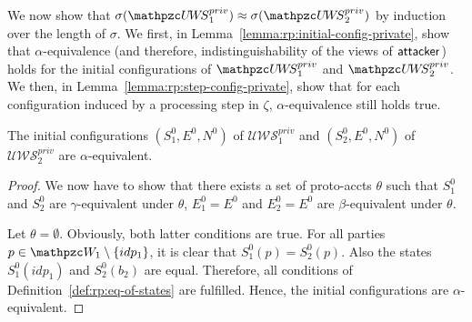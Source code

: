   We now show that $\sigma(\uppressoprivwebsystem_1) \approx
  \sigma(\uppressoprivwebsystem_2)$ by induction over the length 
  of $\sigma$. 
  We first, in Lemma~\ref{lemma:rp:initial-config-private}, 
  show that $\alpha$-equivalence (and therefore, 
  indistinguishability of the views of $\mathsf{attacker}$) holds 
  for the initial configurations of $\uppressoprivwebsystem_1$ 
  and $\uppressoprivwebsystem_2$. 
  We then, in Lemma~\ref{lemma:rp:step-config-private}, 
  show that for each configuration induced by a processing step 
  in $\zeta$, $\alpha$-equivalence still holds true.
  
  \begin{lemma}\label{lemma:rp:initial-config-private}
    The initial configurations $(S_1^0,E^0,N^0)$ of 
    $\mathcal{U\!W\!S}^{priv}_1$ and $(S_2^0,E^0,N^0)$ of 
    $\mathcal{U\!W\!S}^{priv}_2$ are $\alpha$-equivalent.
  \end{lemma}
  \begin{proof}
    We now have to show that there exists a set of proto-accts 
    $\theta$ such that $S_1^0$ and $S_2^0$ are 
    $\gamma$-equivalent under $\theta$, $E_1^0 = E^0$ and 
    $E_2^0 = E^0$ are $\beta$-equivalent under $\theta$.
  
    Let $\theta = \emptyset$. Obviously, both latter conditions 
    are true. For all parties $p \in \bidsystem_1 \setminus \{idp_1\}$, 
    it is clear that $S_1^0(p) = S_2^0(p)$. Also the states 
    $S_1^0(idp_1)$ and $S_2^0(b_2)$ are equal. Therefore, 
    all conditions of Definition~\ref{def:rp:eq-of-states} are 
    fulfilled. Hence, the initial configurations are 
    $\alpha$-equivalent.
  \end{proof}
  
